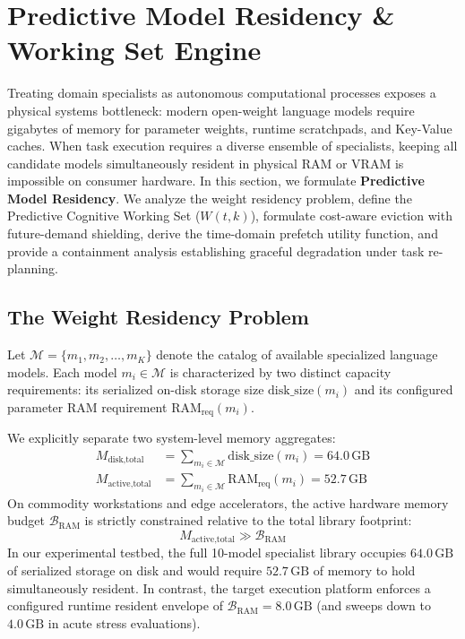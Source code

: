\section{Predictive Model Residency \& Working Set Engine}
\label{sec:predictive_residency}

Treating domain specialists as autonomous computational processes exposes a physical systems bottleneck: modern open-weight language models require gigabytes of memory for parameter weights, runtime scratchpads, and Key-Value caches. When task execution requires a diverse ensemble of specialists, keeping all candidate models simultaneously resident in physical RAM or VRAM is impossible on consumer hardware. In this section, we formulate \textbf{Predictive Model Residency}. We analyze the weight residency problem, define the Predictive Cognitive Working Set ($W(t, k)$), formulate cost-aware eviction with future-demand shielding, derive the time-domain prefetch utility function, and provide a containment analysis establishing graceful degradation under task re-planning.

\subsection{The Weight Residency Problem}
\label{sec:weight_residency_problem}

Let $\mathcal{M} = \{m_1, m_2, \dots, m_K\}$ denote the catalog of available specialized language models. Each model $m_i \in \mathcal{M}$ is characterized by two distinct capacity requirements: its serialized on-disk storage size $\text{disk\_size}(m_i)$ and its configured parameter RAM requirement $\text{RAM}_{\text{req}}(m_i)$.

We explicitly separate two system-level memory aggregates:
\begin{align}
M_{\text{disk,total}} &= \sum_{m_i \in \mathcal{M}} \text{disk\_size}(m_i) = 64.0\,\text{GB} \\
M_{\text{active,total}} &= \sum_{m_i \in \mathcal{M}} \text{RAM}_{\text{req}}(m_i) = 52.7\,\text{GB}
\end{align}
On commodity workstations and edge accelerators, the active hardware memory budget $\mathcal{B}_{\text{RAM}}$ is strictly constrained relative to the total library footprint:
\begin{equation}
M_{\text{active,total}} \gg \mathcal{B}_{\text{RAM}}
\label{eq:memory_bottleneck}
\end{equation}
In our experimental testbed, the full 10-model specialist library occupies $64.0\,\text{GB}$ of serialized storage on disk and would require $52.7\,\text{GB}$ of memory to hold simultaneously resident. In contrast, the target execution platform enforces a configured runtime resident envelope of $\mathcal{B}_{\text{RAM}} = 8.0\,\text{GB}$ (and sweeps down to $4.0\,\text{GB}$ in acute stress evaluations).

